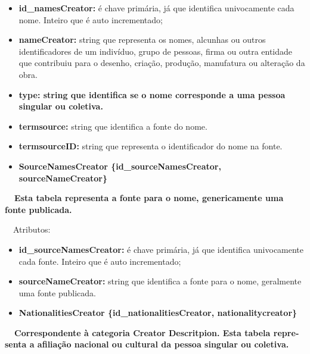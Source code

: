 \documentclass[letterpaper]{article}
\newcommand\textstyleStrongEmphasis[1]{\textbf{#1}}
\newcommand\liststyleLi{%
\renewcommand\labelitemi{{\textbullet}}
\renewcommand\labelitemii{[27A2?]}
\renewcommand\labelitemiii{{\textbullet}}
\renewcommand\labelitemiv{{\textbullet}}
}
\newcommand\liststyleLiii{%
\renewcommand\labelitemi{[27A2?]}
\renewcommand\labelitemii{[27A2?]}
\renewcommand\labelitemiii{[27A2?]}
\renewcommand\labelitemiv{[27A2?]}
}
\newcommand\liststyleLxiv{%
\renewcommand\labelitemi{[27A2?]}
\renewcommand\labelitemii{[27A2?]}
\renewcommand\labelitemiii{[27A2?]}
\renewcommand\labelitemiv{[27A2?]}
}
\begin{document}
\liststyleLxiv
\begin{itemize}
\item {
\textbf{id\_namesCreator: }\'e chave prim\'aria, j\'a que identifica
univocamente cada nome. Inteiro que \'e auto incrementado;}
\item {
\textbf{nameCreator: }string que representa os nomes, alcunhas ou outros
identificadores de um indiv\'iduo, grupo de pessoas, firma ou outra
entidade que contribuiu para o desenho, cria\c{c}\~ao, produ\c{c}\~ao,
manufatura ou altera\c{c}\~ao da obra.}
\item {\bfseries
type:\textmd{ string que identifica se o nome corresponde a uma pessoa
singular ou coletiva.}}
\item {
\textbf{termsource: }string que identifica a fonte do nome.}
\item {
\textbf{termsourceID:} string que representa o identificador do nome na
fonte.}
\end{itemize}

\bigskip

\liststyleLi
\begin{itemize}
\item {\bfseries
SourceNamesCreator\textmd{ \{}\textmd{id\_sourceNamesCreator}\textmd{,
sourceNameCreator\}}}
\end{itemize}
{\bfseries
\foreignlanguage{english}{\textmd{\ \ Esta
}}\textstyleStrongEmphasis{\foreignlanguage{english}{\textmd{tabela}}}\foreignlanguage{english}{\textmd{
representa a fonte para o nome, genericamente uma fonte publicada.}}}


\bigskip

{
\ \ Atributos:}

\liststyleLiii
\begin{itemize}
\item {
\textbf{i}\textbf{d\_sourceNamesCreator}\textbf{:} \'e chave prim\'aria,
j\'a que identifica univocamente cada fonte. Inteiro que \'e auto
incrementado;}
\item {
\textbf{sourceNameCreator:} string que identifica a fonte para o nome,
geralmente uma fonte publicada.}
\end{itemize}

\bigskip

\liststyleLi
\begin{itemize}
\item {\bfseries
NationalitiesCreator\textmd{
\{}\textmd{id\_nationalitiesCreator}\textmd{, nationalitycreator\}}}
\end{itemize}
{\bfseries
\foreignlanguage{english}{\textmd{\ \ Correspondente \`a categoria
}}\textstyleStrongEmphasis{\foreignlanguage{english}{Creator
Descritpion}}\foreignlanguage{english}{\textmd{. Esta
}}\textstyleStrongEmphasis{\foreignlanguage{english}{\textmd{tabela}}}\foreignlanguage{english}{\textmd{
representa a afilia\c{c}\~ao nacional ou cultural da pessoa singular ou
coletiva.}}}
\end{document}
